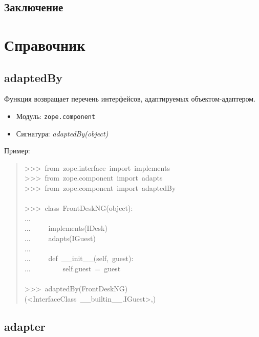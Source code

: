 \documentclass[14pt,a4paper,openany,twoside,final]{extbook}
\providecommand*{\DUroletitlereference}[1]{\textsl{#1}}
\begin{document}
\section{Заключение%
  \label{id53}%
}


\chapter{Справочник%
  \label{id54}%
}


\section*{adaptedBy%
  \label{adaptedby}%
}

Функция возвращает перечень интерфейсов, адаптируемых
объектом-адаптером.

\begin{itemize}

\item Модуль: \texttt{zope.component}

\item Сигнатура: \DUroletitlereference{adaptedBy(object)}

\end{itemize}

Пример:

\begin{quote}{\ttfamily \raggedright \noindent
>{}>{}>~from~zope.interface~import~implements\\
>{}>{}>~from~zope.component~import~adapts\\
>{}>{}>~from~zope.component~import~adaptedBy\\
~\\
>{}>{}>~class~FrontDeskNG(object):\\
...\\
...~~~~~implements(IDesk)\\
...~~~~~adapts(IGuest)\\
...\\
...~~~~~def~\_\_init\_\_(self,~guest):\\
...~~~~~~~~~self.guest~=~guest\\
~\\
>{}>{}>~adaptedBy(FrontDeskNG)\\
(<InterfaceClass~\_\_builtin\_\_.IGuest>,)
}
\end{quote}


\section*{adapter%
  \label{id55}%
}
\end{document}
